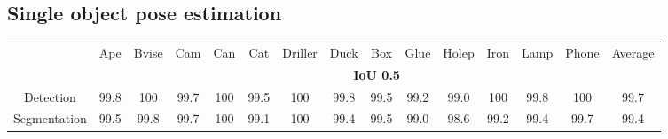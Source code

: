 \documentclass[conference]{IEEEtran}
\newcommand{\method}[1]{Deep-6DPose}
\begin{document}
\subsection{Single object pose estimation}\label{exp:hoi}\begin{table*}[!t]
\vspace{0.5cm}
   \centering
   \footnotesize
    \begin{center}
    \begin{tabular}{c| c c c c c c c c c c c c c c} 
&Ape &Bvise &Cam &Can &Cat &Driller &Duck &Box &Glue &Holep &Iron &Lamp &Phone &Average\\  
\Xhline{0.75pt}
	&\multicolumn{14}{c}{\textbf{IoU 0.5}} \\ 
Detection &99.8 &100 &99.7 &100 &99.5 &100 &99.8 &99.5 &99.2 &99.0 &100 &99.8 &100 &99.7\\ 
Segmentation &99.5 &99.8 &99.7 &100 &99.1 &100 &99.4 &99.5 &99.0 &98.6 &99.2 &99.4 &99.7 &99.4
\\  \hline


\end{tabular}
\end{center}
\end{table*}
\end{document}
